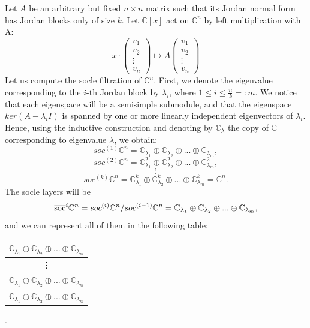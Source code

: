 \documentclass[main.tex]{subfiles}
\begin{document}
\begin{ex}
\label{ex-socle-filtration}
    Let $A$ be an arbitrary but fixed $n\times n$ matrix such that its Jordan normal form has Jordan blocks only of size $k$. Let $\mathbb{C}[x]$ act on $\mathbb{C}^n$ by left multiplication with A:
    $$x
    \cdot 
    \begin{pmatrix}
        v_1 \\
        v_2 \\
        \vdots \\
        v_n
    \end{pmatrix}
    \mapsto 
    A
    \begin{pmatrix}
        v_1 \\
        v_2 \\
        \vdots \\
        v_n
    \end{pmatrix}
    $$
    Let us compute the socle filtration of $\mathbb{C}^n.$ First, we denote the eigenvalue corresponding to the $i$-th Jordan block by $\lambda_i$, where $1\leq i\leq \frac{n}{k}=:m$. We notice that each eigenspace will be a semisimple submodule, and that the eigenspace $ker(A-\lambda_iI)$ is spanned by one or more linearly independent eigenvectors of $\lambda_i$.
    Hence, using the inductive construction and denoting by $\mathbb{C}_\lambda$ the copy of $\mathbb{C}$ corresponding to eigenvalue $\lambda$, we obtain:
    $$soc^{(1)}\mathbb{C}^n = \mathbb{C}_{\lambda_1}\oplus \mathbb{C}_{\lambda_2}\oplus ... \oplus\mathbb{C}_{\lambda_m}, $$
    $$soc^{(2)}\mathbb{C}^n = \mathbb{C}_{\lambda_1}^2\oplus \mathbb{C}^2_{\lambda_2}\oplus ... \oplus\mathbb{C}^2_{\lambda_m}, $$
    $$\vdots$$
    $$soc^{(k)}\mathbb{C}^n = \mathbb{C}_{\lambda_1}^k\oplus \mathbb{C}^k_{\lambda_2}\oplus ... \oplus\mathbb{C}^k_{\lambda_m} = \mathbb{C}^n. $$
    The socle layers will be $$\overline{\text{soc}}^{i}\mathbb{C}^n = soc^{(i)}\mathbb{C}^n / soc^{(i-1)}\mathbb{C}^n = \mathbb{C}_{\lambda_1}\oplus \mathbb{C}_{\lambda_2}\oplus ... \oplus\mathbb{C}_{\lambda_m},$$
    and we can represent all of them in the following table:
    \begin{table}[h]
        \centering
        \begin{tabular}{|c|}
            \hline
            $\mathbb{C}_{\lambda_1}\oplus \mathbb{C}_{\lambda_2}\oplus ... \oplus\mathbb{C}_{\lambda_m}$ \\
            \hline \vdots \\
           \hline $\mathbb{C}_{\lambda_1}\oplus \mathbb{C}_{\lambda_2}\oplus ... \oplus\mathbb{C}_{\lambda_m}$ \\
            \hline $\mathbb{C}_{\lambda_1}\oplus \mathbb{C}_{\lambda_2}\oplus ... \oplus\mathbb{C}_{\lambda_m}$ \\
            \hline
        \end{tabular} .
    \end{table}
\end{ex}
\bigskip
\end{document}
